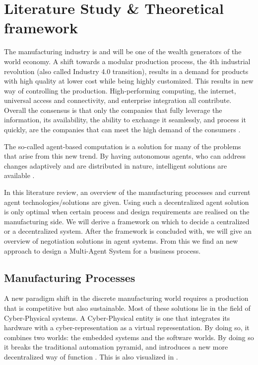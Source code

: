 \chapter{Literature Study \& Theoretical framework}
\label{ch:literature}
The manufacturing industry is and will be one of the wealth generators of the world economy. A shift towards a modular production process, the 4th industrial revolution (also called Industry 4.0 transition), results in a demand for products with high quality at lower cost while being highly customized. This results in new way of controlling the production. High-performing computing, the internet, universal access and connectivity, and enterprise integration all contribute. Overall the consensus is that only the companies that fully leverage the information, its availability, the ability to exchange it seamlessly, and process it quickly, are the companies that can meet the high demand of the consumers \citep{monostori2006agent}. 

The so-called agent-based computation is a solution for many of the problems that arise from this new trend. By having autonomous agents, who can address changes adaptively and are distributed in nature, intelligent solutions are available \citep{monostori2006agent}.

In this literature review, an overview of the manufacturing processes and current agent technologies/solutions are given. Using such a decentralized agent solution is only optimal when certain process and design requirements are realised on the manufacturing side. We will derive a framework on which to decide a centralized or a decentralized system. After the framework is concluded with, we will give an overview of negotiation solutions in agent systems. From this we find an new approach to design a Multi-Agent System for a business process.

\section{Manufacturing Processes}
	
A new paradigm shift in the discrete manufacturing world requires a production that is competitive but also sustainable. Most of these solutions lie in the field of Cyber-Physical systems. A Cyber-Physical entity is one that integrates its hardware with a cyber-representation as a virtual representation. By doing so, it combines two worlds: the embedded systems and the software worlds. By doing so it breaks the traditional automation pyramid, and introduces a new more decentralized way of function \citep{leitao2016smart}. This is also visualized in . %
	

